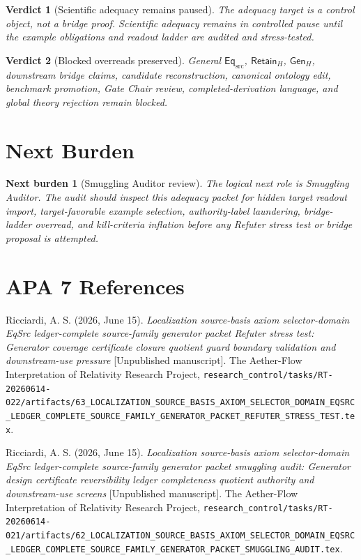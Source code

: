 \documentclass[11pt]{article}
\newcommand{\EqSrc}{\mathsf{Eq}_{\mathrm{src}}}
\newcommand{\RetainH}{\mathsf{Retain}_{H}}
\newcommand{\GenH}{\mathsf{Gen}_{H}}
\newtheorem{verdict}{Verdict}
\newtheorem{nextburden}{Next burden}
\begin{document}
\begin{verdict}[Scientific adequacy remains paused]
The adequacy target is a control object, not a bridge proof. Scientific
adequacy remains in controlled pause until the example obligations and
readout ladder are audited and stress-tested.
\end{verdict}

\begin{verdict}[Blocked overreads preserved]
General \(\EqSrc\), \(\RetainH\), \(\GenH\), downstream bridge claims,
candidate reconstruction, canonical ontology edit, benchmark promotion,
Gate Chair review, completed-derivation language, and global theory
rejection remain blocked.
\end{verdict}

\section{Next Burden}

\begin{nextburden}[Smuggling Auditor review]
The logical next role is Smuggling Auditor. The audit should inspect
this adequacy packet for hidden target readout import, target-favorable
example selection, authority-label laundering, bridge-ladder overread,
and kill-criteria inflation before any Refuter stress test or bridge
proposal is attempted.
\end{nextburden}

\section*{APA 7 References}

Ricciardi, A. S. (2026, June 15). \emph{Localization source-basis axiom
selector-domain EqSrc ledger-complete source-family generator packet
Refuter stress test: Generator coverage certificate closure quotient
guard boundary validation and downstream-use pressure} [Unpublished
manuscript]. The Aether-Flow Interpretation of Relativity Research
Project,
\texttt{research\_control/tasks/RT-20260614-022/artifacts/63\_LOCALIZATION\_SOURCE\_BASIS\_AXIOM\_SELECTOR\_DOMAIN\_EQSRC\_LEDGER\_COMPLETE\_SOURCE\_FAMILY\_GENERATOR\_PACKET\_REFUTER\_STRESS\_TEST.tex}.

Ricciardi, A. S. (2026, June 15). \emph{Localization source-basis axiom
selector-domain EqSrc ledger-complete source-family generator packet
smuggling audit: Generator design certificate reversibility ledger
completeness quotient authority and downstream-use screens}
[Unpublished manuscript]. The Aether-Flow Interpretation of Relativity
Research Project,
\texttt{research\_control/tasks/RT-20260614-021/artifacts/62\_LOCALIZATION\_SOURCE\_BASIS\_AXIOM\_SELECTOR\_DOMAIN\_EQSRC\_LEDGER\_COMPLETE\_SOURCE\_FAMILY\_GENERATOR\_PACKET\_SMUGGLING\_AUDIT.tex}.
\end{document}
